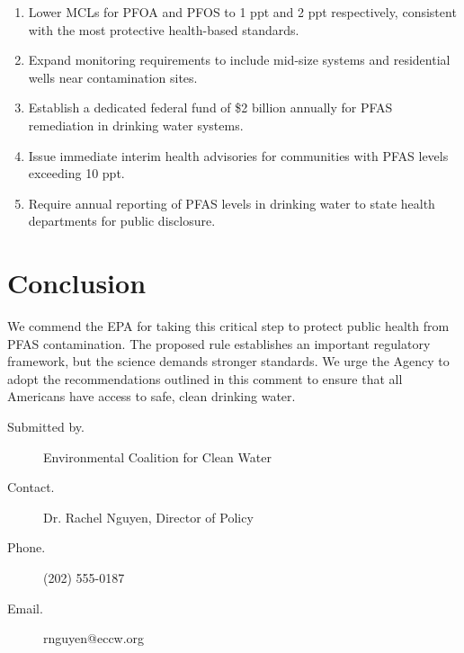 \documentclass[
    language=english,
    doctype=public-comment,
    institution=none,
]{../../omnilatex}
\begin{document}
\begin{enumerate}
    \item Lower MCLs for PFOA and PFOS to 1 ppt and 2 ppt respectively,
          consistent with the most protective health-based standards.
    \item Expand monitoring requirements to include mid-size systems and
          residential wells near contamination sites.
    \item Establish a dedicated federal fund of \$2 billion annually for
          PFAS remediation in drinking water systems.
    \item Issue immediate interim health advisories for communities with
          PFAS levels exceeding 10 ppt.
    \item Require annual reporting of PFAS levels in drinking water to
          state health departments for public disclosure.
\end{enumerate}

\section{Conclusion}

We commend the EPA for taking this critical step to protect public health
from PFAS contamination. The proposed rule establishes an important
regulatory framework, but the science demands stronger standards. We urge
the Agency to adopt the recommendations outlined in this comment to ensure
that all Americans have access to safe, clean drinking water.

\begin{description}
    \item[Submitted by.] Environmental Coalition for Clean Water
    \item[Contact.] Dr. Rachel Nguyen, Director of Policy
    \item[Phone.] (202) 555-0187
    \item[Email.] rnguyen@eccw.org
\end{description}
\end{document}
